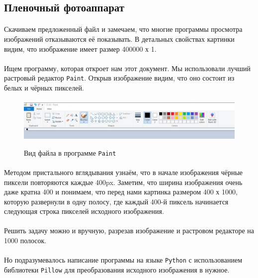 \documentclass[12pt]{article}
\begin{document}
    \subsection{Пленочный фотоаппарат}
    \paragraph{}
    Скачиваем предложенный файл и замечаем, что многие программы просмотра изображений
    отказываются её показывать. В детальных свойствах картинки видим,
    что изображение имеет размер 400000 х 1.
    \paragraph{}
    Ищем программу, которая откроет нам этот документ. Мы использовали лучший растровый редактор \verb|Paint|.
    Открыв изображение видим, что оно состоит из белых и чёрных пикселей.
    \paragraph{}
    \begin{figure}[H]
        \centering
        \includegraphics[width=\linewidth]{task12}
        \label{fig:task12}
        \caption{Вид файла в программе \verb|Paint|}
    \end{figure}
    \paragraph{}
    Методом пристального вглядывания узнаём, что в начале изображения чёрные пиксели повторяются каждые 400px.
    Заметим, что ширина изображения очень даже кратна 400 и понимаем, что перед нами картинка размером 400 х 1000,
    которую развернули в одну полосу, где каждый 400-й пиксель начинается следующая строка пикселей исходного изображения.
    \paragraph{}
    Решить задачу можно и вручную, разрезав изображение и растровом редакторе на 1000 полосок.
    \paragraph{}
    Но подразумевалось написание программы на языке \verb|Python| с использованием библиотеки \verb|Pillow|
    для преобразования исходного изображения в нужное.
\end{document}
